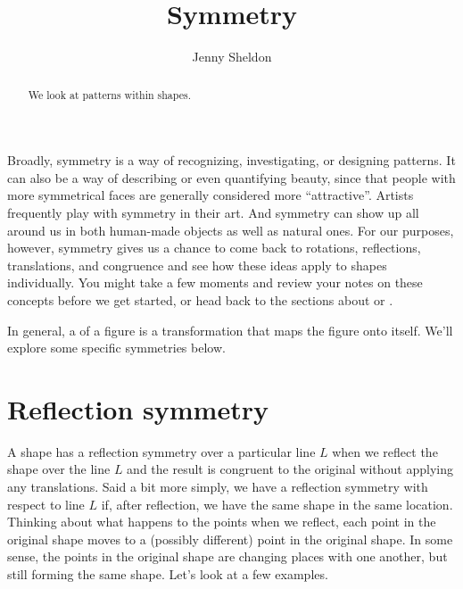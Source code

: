 \documentclass{ximera}
\title{Symmetry}
\author{Jenny Sheldon}
\begin{document}
\begin{abstract}
We look at patterns within shapes.
\end{abstract}
\maketitle

Broadly, symmetry is a way of recognizing, investigating, or designing patterns. It can also be a way of describing or even quantifying beauty, since  that people with more symmetrical faces are generally considered more ``attractive''. Artists frequently play with symmetry in their art. And symmetry can show up all around us in both human-made objects as well as natural ones. For our purposes, however, symmetry gives us a chance to come back to rotations, reflections, translations, and congruence and see how these ideas apply to shapes individually. You might take a few moments and review your notes on these concepts before we get started, or head back to the sections about  or .

In general, a  of a figure is a transformation that maps the figure onto itself. We'll explore some specific symmetries below. 

\section{Reflection symmetry}

A shape has a reflection symmetry over a particular line $L$ when we reflect the shape over the line $L$ and the result is congruent to the original without applying any translations. Said a bit more simply, we have a reflection symmetry with respect to line $L$ if, after reflection, we have the same shape in the same location. Thinking about what happens to the points when we reflect, each point in the original shape moves to a (possibly different) point in the original shape. In some sense, the points in the original shape are changing places with one another, but still forming the same shape. Let's look at a few examples.
\end{document}

